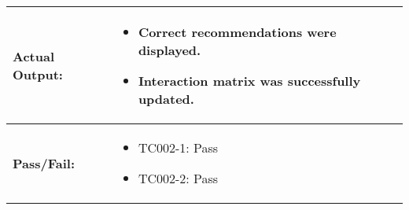 \noindent
\begin{tabularx}{\textwidth}{|>{\raggedright\arraybackslash}p{4cm}|X|}
    \hline
    \textbf{Actual Output:} & 
    \begin{itemize}
        \item Correct recommendations were displayed.
        \item Interaction matrix was successfully updated.
    \end{itemize}
    \\ \hline
    \textbf{Pass/Fail:} & 
    \begin{itemize}
        \item TC002-1: Pass
        \item TC002-2: Pass
    \end{itemize}
    \\ \hline
\end{tabularx}